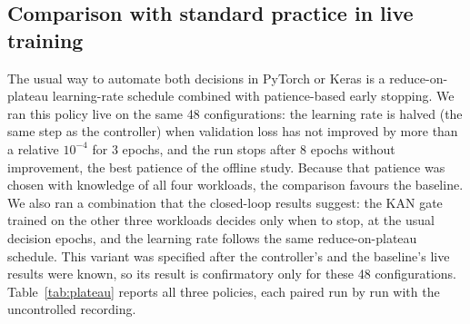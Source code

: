 \subsection*{Comparison with standard practice in live training}
The usual way to automate both decisions in PyTorch or Keras is a reduce-on-plateau learning-rate schedule combined with patience-based early stopping. We ran this policy live on the same 48 configurations: the learning rate is halved (the same step as the controller) when validation loss has not improved by more than a relative $10^{-4}$ for 3 epochs, and the run stops after 8 epochs without improvement, the best patience of the offline study. Because that patience was chosen with knowledge of all four workloads, the comparison favours the baseline. We also ran a combination that the closed-loop results suggest: the KAN gate trained on the other three workloads decides only when to stop, at the usual decision epochs, and the learning rate follows the same reduce-on-plateau schedule. This variant was specified after the controller's and the baseline's live results were known, so its result is confirmatory only for these 48 configurations. Table~\ref{tab:plateau} reports all three policies, each paired run by run with the uncontrolled recording.

\begin{table}[t]
\centering
\caption{Three policies controlling the same 48 live training processes (12 configurations of seed 2 per workload). Epochs: epochs used out of 480 per workload (1{,}920 in total). Median: median relative change in best validation loss against the same run uncontrolled (\%, negative is better). B/W: runs more than 2\% better / worse than uncontrolled.}
\label{tab:plateau}
\footnotesize
\setlength{\tabcolsep}{3.5pt}
\end{table}

